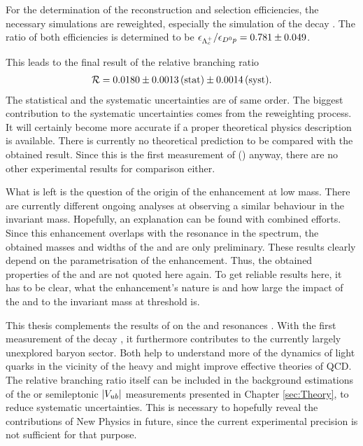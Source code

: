 For the determination of the reconstruction and selection efficiencies, the necessary simulations are reweighted, especially the simulation of the decay \LbToDpmunuX.
The ratio of both efficiencies is determined to be $\epsilon_{{{\Lambda}^+_{c}}}/\epsilon_{{{D}^0}{p}} = 0.781 \pm 0.049$.

This leads to the final result of the relative branching ratio
\begin{align*}
    \mathcal{R} = 0.0180 \pm 0.0013\mathrm{\,(stat)} \pm 0.0014\mathrm{\,(syst)}.
\end{align*}
The statistical and the systematic uncertainties are of same order.
The biggest contribution to the systematic uncertainties comes from the reweighting process.
It will certainly become more accurate if a proper theoretical physics description is available.
There is currently no theoretical prediction to be compared with the obtained result.
Since this is the first measurement of \BR(\LbToDpmunuX) anyway, there are no other experimental results for comparison either.

What is left is the question of the origin of the enhancement at low \Dz\proton mass.
There are currently different ongoing analyses at \lhcb observing a similar behaviour in the invariant \Dz\proton mass.
Hopefully, an explanation can be found with combined efforts.
Since this enhancement overlaps with the \LcResI resonance in the \Dz\proton spectrum, the obtained masses and widths of the \LcResI and \LcResII are only preliminary.
These results clearly depend on the parametrisation of the enhancement.
Thus, the obtained properties of the \LcResI and \LcResII are not quoted here again.
To get reliable results here, it has to be clear, what the enhancement's nature is and how large the impact of the  and  to the invariant \Dz\proton mass at threshold is.

This thesis complements the results of \babar on the \LcResI and \LcResII resonances \cite{BaBar_D0p}.
With the first measurement of the decay \LbToDpmunuX, it furthermore contributes to the currently largely unexplored \bquark baryon sector.
Both help to understand more of the dynamics of light quarks in the vicinity of the heavy \bquark and might improve effective theories of QCD.
The relative branching ratio \R itself can be included in the background estimations of the \asld or semileptonic $|{V_{{u}{b}}}|$ measurements presented in Chapter \ref{sec:Theory}, to reduce systematic uncertainties.
This is necessary to hopefully reveal the contributions of New Physics in future, since the current experimental precision is not sufficient for that purpose.
